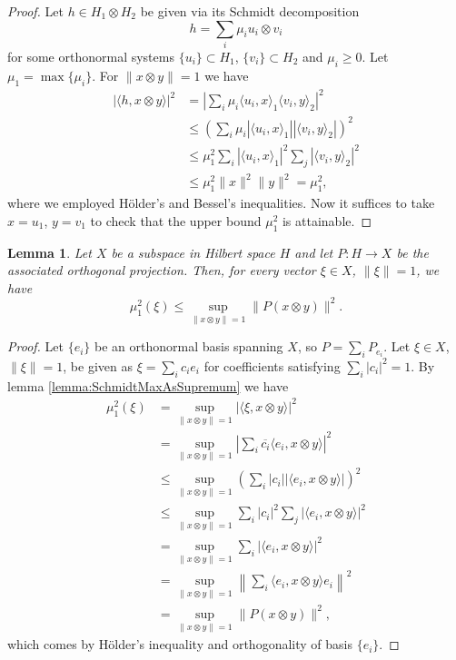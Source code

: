 \documentclass[reqno]{amsart}
\theoremstyle{plain}
\newtheorem{lemma}[theorem]{Lemma}
\theoremstyle{note}
\newcommand{\proj}[1]{P_{#1}}
\newcommand{\iprod}[2]{\langle #1 , #2 \rangle}
\begin{document}
\begin{proof}
    Let $h \in H_1 \otimes H_2$ be given via its Schmidt decomposition
    \begin{equation}
        h = \sum_i \mu_i u_i \otimes v_i
    \end{equation}
    for some orthonormal systems $\{u_i\}\subset H_1$, $\{v_i\}\subset H_2$ and $\mu_i \geqslant 0$. Let $\mu_1 = \max{\{\mu_i\}}$. For $\|x \otimes y\| = 1 $ we have
    \begin{align}
        |\iprod{h}{x\otimes y}|^2 &= \left| \sum_{i} \mu_i \iprod{u_i}{x}_1 \iprod{v_i}{y}_2 \right|^2 \\
        &\leqslant \left(\sum_i \mu_i |\iprod{u_i}{x}_1| |\iprod{v_i}{y}_2| \right)^2 \nonumber \\
        &\leqslant \mu_{1}^{2} \sum_i |\iprod{u_i}{x}_1|^{2} \sum_j |\iprod{v_i}{y}_2|^2 \nonumber \\
        &\leqslant \mu_{1}^{2} \| x \|^2 \|y \|^2 \nonumber = \mu_{1}^{2}, \nonumber
    \end{align}
    where we employed H\"{o}lder's and Bessel's inequalities. Now it suffices to take $x = u_1$, $y = v_1$ to check that the upper bound $\mu_{1}^{2}$ is attainable.
\end{proof}

\begin{lemma}\label{lemma:SchmidtCoeffOfProjection}
    Let $X$ be a subspace in Hilbert space $H$ and let $P : H \to X$ be the associated orthogonal projection. Then, for every vector $\xi \in X$, $\| \xi \| = 1$, we have
    \begin{equation}
        \mu_{1}^{2}(\xi) \leqslant \sup_{\|x\otimes y\| = 1}{\|P (x\otimes y)\|^{2}}.
    \end{equation}
\end{lemma}

\begin{proof}
    Let $\{e_i\}$ be an orthonormal basis spanning $X$, so $P = \sum_{i} \proj{e_i}$. Let $\xi \in X$, $\| \xi \| = 1$, be given as $\xi = \sum_i c_i e_i$ for coefficients satisfying $\sum_i |c_i|^2 = 1$. By lemma \ref{lemma:SchmidtMaxAsSupremum} we have
    \begin{align}
        \mu_{1}^{2}(\xi) &= \sup_{\|x\otimes y\|=1}{|\iprod{\xi}{x\otimes y}|^2} \\
        &= \sup_{\|x\otimes y\|=1}{\left|\sum_i \overline{c_i}\iprod{e_i}{x\otimes y}\right|^2} \nonumber\\
        &\leqslant \sup_{\|x\otimes y\|=1}{\left(\sum_i |c_i||\iprod{e_i}{x\otimes y}|\right)^2} \nonumber\\
        &\leqslant \sup_{\|x\otimes y\|=1}{\sum_i |c_i|^2 \sum_j |\iprod{e_i}{x\otimes y}|^2} \nonumber\\
        &= \sup_{\|x\otimes y\|=1}{\sum_i |\iprod{e_i}{x\otimes y}|^2} \nonumber \\
        &= \sup_{\|x\otimes y\|=1}{\left\|\sum_i \iprod{e_i}{x\otimes y}e_i\right\|^2} \nonumber\\
        &= \sup_{\|x\otimes y\|=1}{\| P(x\otimes y)\|^{2}},\nonumber
    \end{align}
    which comes by H\"{o}lder's inequality and orthogonality of basis $\{e_i\}$.
\end{proof}
\end{document}
